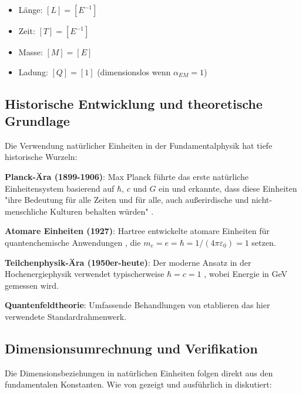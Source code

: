 \documentclass[12pt,a4paper]{article}
\begin{document}
	\begin{tcolorbox}[colback=blue!5!white,colframe=blue!75!black,title=Dimensionen in natürlichen Einheiten \citep{weinberg1995}]
		\begin{itemize}
			\item Länge: $[L] = [E^{-1}]$
			\item Zeit: $[T] = [E^{-1}]$ 
			\item Masse: $[M] = [E]$
			\item Ladung: $[Q] = [1]$ (dimensionslos wenn $\alpha_{EM} = 1$)
		\end{itemize}
	\end{tcolorbox}
	
	\subsection{Historische Entwicklung und theoretische Grundlage}
	\label{subsec:historical_development}
	
	Die Verwendung natürlicher Einheiten in der Fundamentalphysik hat tiefe historische Wurzeln:
	
	\textbf{Planck-Ära (1899-1906)}: Max Planck führte das erste natürliche Einheitensystem basierend auf $\hbar$, $c$ und $G$ ein \citep{planck1900,planck1906} und erkannte, dass diese Einheiten "ihre Bedeutung für alle Zeiten und für alle, auch außerirdische und nicht-menschliche Kulturen behalten würden" \citep{planck1906}.
	
	\textbf{Atomare Einheiten (1927)}: Hartree entwickelte atomare Einheiten für quantenchemische Anwendungen \citep{hartree1927,hartree1957}, die $m_e = e = \hbar = 1/(4\pi\varepsilon_0) = 1$ setzen.
	
	\textbf{Teilchenphysik-Ära (1950er-heute)}: Der moderne Ansatz in der Hochenergiephysik verwendet typischerweise $\hbar = c = 1$ \citep{bjorken1964,itzykson1980}, wobei Energie in GeV gemessen wird.
	
	\textbf{Quantenfeldtheorie}: Umfassende Behandlungen von \citet{weinberg1995,peskin1995,srednicki2007} etablieren das hier verwendete Standardrahmenwerk.
	
	\subsection{Dimensionsumrechnung und Verifikation}
	
	Die Dimensionsbeziehungen in natürlichen Einheiten folgen direkt aus den fundamentalen Konstanten. Wie von \citet{weinberg1995} gezeigt und ausführlich in \citet{zee2010} diskutiert:
	
\end{document}
